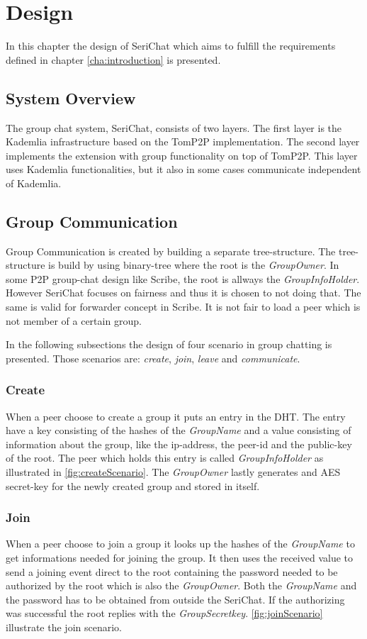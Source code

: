 \chapter{Design} \label{cha:design}
In this chapter the design of SeriChat which aims to fulfill the requirements defined in chapter \ref{cha:introduction} is presented.

\section{System Overview}
The group chat system, SeriChat, consists of two layers. The first layer is the Kademlia infrastructure based on the TomP2P implementation. The second layer implements the extension with group functionality on top of TomP2P. This layer uses Kademlia functionalities, but it also in some cases communicate independent of Kademlia. 

\section{Group Communication}
Group Communication is created by building a separate tree-structure. The tree-structure is build by using binary-tree where the root is the \textit{GroupOwner}. In some P2P group-chat design like Scribe, the root is allways the \textit{GroupInfoHolder}. However SeriChat focuses on fairness and thus it is chosen to not doing that. The same is valid for forwarder concept in Scribe. It is not fair to load a peer which is not member of a certain group.

In the following subsections the design of four scenario in group chatting is presented. Those scenarios are: \textit{create}, \textit{join}, \textit{leave} and \textit{communicate}.

\subsection{Create}
When a peer choose to create a group it puts an entry in the DHT. The entry have a key consisting of the hashes of the \textit{GroupName} and a value consisting of information about the group, like the ip-address, the peer-id and the public-key of the root. The peer which holds this entry is called \textit{GroupInfoHolder} as illustrated in \autoref{fig:createScenario}. The \textit{GroupOwner} lastly generates and AES secret-key for the newly created group and stored in itself.

\subsection{Join}
When a peer choose to join a group it looks up the hashes of the \textit{GroupName} to get informations needed for joining the group. It then uses the received value to send a joining event direct to the root containing the password needed to be authorized by the root which is also the \textit{GroupOwner}. Both the \textit{GroupName} and the password has to be obtained from outside the SeriChat. If the authorizing was successful the root replies with the \textit{GroupSecretkey}. \autoref{fig:joinScenario} illustrate the join scenario.

